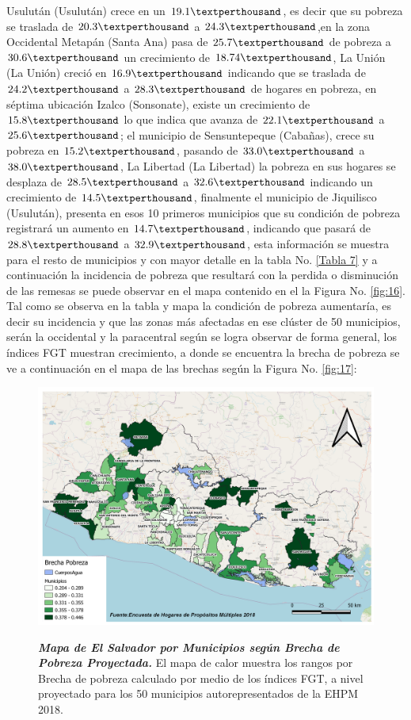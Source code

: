 Usulután (Usulután) crece en un $19.1 \textperthousand$, es decir que su pobreza se traslada de $20.3 \textperthousand$ a $24.3 \textperthousand$,en la zona Occidental Metapán (Santa Ana) pasa de $25.7 \textperthousand$ de pobreza a $30.6 \textperthousand$ un crecimiento de $18.74 \textperthousand$, La Unión (La Unión) creció en $16.9 \textperthousand$ indicando que se traslada de $24.2 \textperthousand$ a $28.3 \textperthousand$ de hogares en pobreza, en séptima ubicación Izalco (Sonsonate), existe un crecimiento de $15.8 \textperthousand$ lo que indica que avanza de $22.1 \textperthousand$ a $25.6 \textperthousand$; el municipio de Sensuntepeque (Cabañas), crece su pobreza en $15.2 \textperthousand$, pasando de $33.0 \textperthousand$ a $38.0 \textperthousand$, La Libertad (La Libertad) la pobreza en sus hogares se desplaza de $28.5 \textperthousand$ a $32.6 \textperthousand$ indicando un crecimiento de $14.5 \textperthousand$, finalmente el municipio de Jiquilisco (Usulután), presenta en esos 10 primeros municipios que su condición de pobreza registrará un aumento en $14.7 \textperthousand$, indicando que pasará de $28.8 \textperthousand$ a $32.9 \textperthousand$, esta información se muestra para el resto de municipios y con mayor detalle en la tabla No. \eqref{Tabla 7} y a continuación la incidencia de pobreza que resultará con la perdida o disminución de las remesas se puede observar en el mapa contenido en el la Figura No. \eqref{fig:16}. Tal como se observa en la tabla y mapa la condición de pobreza aumentaría, es decir su incidencia y que las zonas más afectadas en ese clúster de 50 municipios, serán la occidental y la paracentral según se logra observar de forma general, los índices FGT muestran crecimiento, a donde se encuentra la brecha de pobreza se ve a continuación en el mapa de las brechas según la Figura No. \eqref{fig:17}:

\begin{figure}[H]
	\centering
	\includegraphics[width=1\linewidth]{Imagenes/Brecha2}
	\caption{\textbf{\textit{Mapa de El Salvador por Municipios según Brecha de Pobreza Proyectada.}} {\small El mapa de calor muestra los rangos por Brecha de pobreza calculado por medio de los índices FGT, a nivel proyectado para los 50 municipios autorepresentados de la EHPM 2018.}
	} 
	\label{fig:17}
	\resizebox{20 cm}{!} { }
	
\end{figure}

